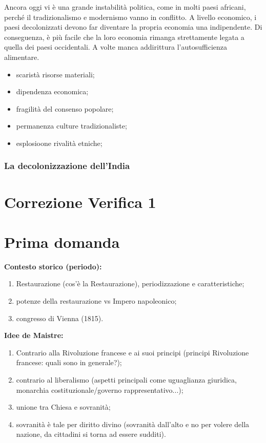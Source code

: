 \documentclass[a4paper]{article}
\begin{document}
Ancora oggi vi è una grande instabilità politica, come in molti paesi africani,
perché il tradizionalismo e modernismo vanno in conflitto.
A livello economico, i paesi decolonizzati
devono far diventare la propria economia una indipendente.
Di conseguenza, è più facile che la loro economia rimanga
strettamente legata a quella dei paesi occidentali.
A volte manca addirittura l'autosufficienza alimentare.
\begin{itemize}
    \item scaristà risorse materiali;
    \item dipendenza economica;
    \item fragilità del consenso popolare;
    \item permanenza culture tradizionaliste;
    \item esplosioone rivalità etniche;
\end{itemize}

\subsubsection{La decolonizzazione dell'India}

\pagebreak

\section{Correzione Verifica 1}

\section{Prima domanda}

\textbf{Contesto storico (periodo):}
\begin{enumerate}
    \item Restaurazione (cos'è la Restaurazione), periodizzazione e caratteristiche;
    \item potenze della restaurazione vs Impero napoleonico;
    \item congresso di Vienna (1815).
\end{enumerate}

\textbf{Idee de Maistre:}
\begin{enumerate}
    \item Contrario alla Rivoluzione francese e ai suoi principi (principi Rivoluzione francese: quali sono in generale?);
    \item contrario al liberalismo (aspetti principali come uguaglianza giuridica, monarchia costituzionale/governo rappresentativo...);
    \item unione tra Chiesa e sovranità;
    \item sovranità è tale per diritto divino (sovranità dall'alto e no per volere della nazione, da cittadini si torna ad essere sudditi).
\end{enumerate}
\end{document}

